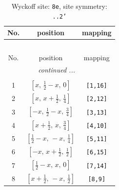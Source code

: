 \documentclass[fleqn,8pt]{jsarticle}
\begin{document}
\begin{longtable}{ccc}
\caption{Wyckoff site: {\tt 8e}, site symmetry: {\tt ..2'}}
 \\
 \hline \hline
No. & position & mapping \\ \hline \endfirsthead

\multicolumn{2}{l}{\tablename\ \thetable{}} \\
 \hline \hline
No. & position & mapping \\ \hline \endhead

 \hline \hline
\multicolumn{2}{r}{\footnotesize\it continued ...} \\ \endfoot

 \hline \hline
\multicolumn{2}{r}{} \\ \endlastfoot

1 & $\left[ x,\, \frac{1}{2} - x,\, 0 \right]$ & {\tt [1,16]} \\ \hline
2 & $\left[ x,\, x + \frac{1}{2},\, \frac{1}{4} \right]$ & {\tt [2,12]} \\ \hline
3 & $\left[ - x,\, \frac{1}{2} - x,\, \frac{3}{4} \right]$ & {\tt [3,13]} \\ \hline
4 & $\left[ x + \frac{1}{2},\, x,\, \frac{3}{4} \right]$ & {\tt [4,10]} \\ \hline
5 & $\left[ \frac{1}{2} - x,\, - x,\, \frac{1}{4} \right]$ & {\tt [5,11]} \\ \hline
6 & $\left[ - x,\, x + \frac{1}{2},\, \frac{1}{2} \right]$ & {\tt [6,15]} \\ \hline
7 & $\left[ \frac{1}{2} - x,\, x,\, 0 \right]$ & {\tt [7,14]} \\ \hline
8 & $\left[ x + \frac{1}{2},\, - x,\, \frac{1}{2} \right]$ & {\tt [8,9]} \\
\end{longtable}
\renewcommand{\arraystretch}{1.2}
\end{document}
